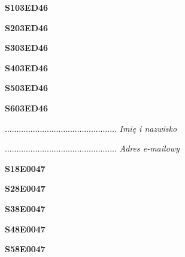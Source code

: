 \begin{turn}{90}\huge \textbf{S103ED46}\end{turn}

\begin{turn}{90}\huge \textbf{S203ED46}\end{turn}

\begin{turn}{90}\huge \textbf{S303ED46}\end{turn}

\begin{turn}{90}\huge \textbf{S403ED46}\end{turn}

\begin{turn}{90}\huge \textbf{S503ED46}\end{turn}

\begin{turn}{90}\huge \textbf{S603ED46}\end{turn}

\begin{turn}{90}\begin{minipage}{\linewidth} \vspace{20mm} ................................................  \textit{Imię i nazwisko}\end{minipage}\end{turn}

\begin{turn}{90}\begin{minipage}{\linewidth} \vspace{20mm} ................................................  \textit{Adres e-mailowy}\end{minipage}\end{turn}

\begin{turn}{90}\huge \textbf{S18E0047}\end{turn}

\begin{turn}{90}\huge \textbf{S28E0047}\end{turn}

\begin{turn}{90}\huge \textbf{S38E0047}\end{turn}

\begin{turn}{90}\huge \textbf{S48E0047}\end{turn}

\begin{turn}{90}\huge \textbf{S58E0047}\end{turn}


